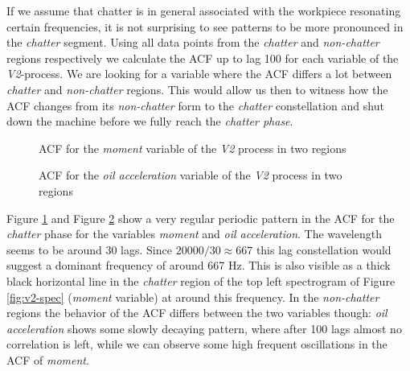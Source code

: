 \documentclass[12 pt]{scrartcl}
\begin{document}
If we assume that chatter is in general associated with the workpiece resonating certain frequencies, it is not surprising to see patterns to be more pronounced in the \emph{chatter} segment. Using all data points from the \emph{chatter} and \emph{non-chatter} regions respectively we calculate the ACF up to lag 100 for each variable of the \emph{V2}-process. We are looking for a variable where the ACF differs a lot between \emph{chatter} and \emph{non-chatter} regions. This would allow us then to witness how the ACF changes from its \emph{non-chatter} form to the \emph{chatter} constellation and shut down the machine before we fully reach the \emph{chatter phase}.

\begin{figure}[p]
  \caption{ACF for the \emph{moment} variable of the \emph{V2} process in two regions}
  \label{fig:v2-moment-acfs}
\end{figure}


\begin{figure}[p]
  \caption{ACF for the \emph{oil acceleration} variable of the \emph{V2} process in two regions}
  \label{fig:v2-oil-acfs}
\end{figure}


Figure \ref{fig:v2-moment-acfs} and Figure \ref{fig:v2-oil-acfs} show a very regular periodic pattern in the ACF for the \emph{chatter} phase for the variables \emph{moment} and \emph{oil acceleration}. The wavelength seems to be around 30 lags. Since $20000/30 \approx 667$ this lag constellation would suggest a dominant frequency of around 667 Hz. This is also visible as a thick black horizontal line in the \emph{chatter} region of the top left spectrogram of Figure \ref{fig:v2-spec} (\emph{moment} variable) at around this frequency.
In the \emph{non-chatter} regions the behavior of the ACF differs between the two variables though: \emph{oil acceleration} shows some slowly decaying pattern, where after 100 lags almost no correlation is left, while we can observe some high frequent oscillations in the ACF of \emph{moment}.
\end{document}
